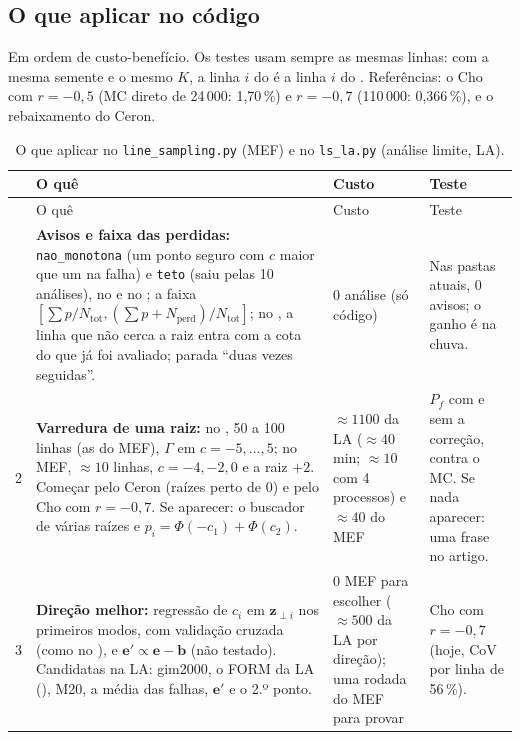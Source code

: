 \documentclass[11pt,a4paper]{article}
\begin{document}
\subsection{O que aplicar no código}\label{sec:codigo}
Em ordem de custo-benefício. Os testes usam sempre as mesmas linhas: com a mesma semente e o mesmo $K$, a linha $i$ do
 é a linha $i$ do . Referências: o Cho com $r = -0{,}5$ (MC direto de
24\,000: 1,70\,\%) e $r = -0{,}7$ (110\,000: 0,366\,\%), e o rebaixamento do Ceron.
{\small\setlength{\tabcolsep}{4pt}
\begin{longtable}{L{0.25cm}L{8.2cm}L{3.4cm}L{3.5cm}}
\caption{O que aplicar no \texttt{line\_sampling.py} (MEF) e no \texttt{ls\_la.py} (análise limite, LA).}
\label{tab:codigo}\\
\toprule
& O quê & Custo & Teste \\
\midrule\endfirsthead
\toprule & O quê & Custo & Teste \\ \midrule\endhead
\bottomrule{} & \textbf{Avisos e faixa das perdidas:} \texttt{nao\_monotona} (um ponto seguro com $c$ maior que um na falha) e
  \texttt{teto} (saiu pelas 10 análises), no  e no ; a faixa
  $[\sum p/N_\text{tot}, (\sum p + N_\text{perd})/N_\text{tot}]$; no , a linha que não cerca a raiz entra
  com a cota do que já foi avaliado; parada ``duas vezes seguidas''. &
  0 análise (só código) & Nas pastas atuais, 0 avisos; o ganho é na chuva. \\
2 & \textbf{Varredura de uma raiz:} no , 50 a 100 linhas (as do MEF), $\Gamma$ em $c = -5, \dots, 5$;
  no MEF, $\approx 10$ linhas, $c = -4, -2, 0$ e a raiz $+2$. Começar pelo Ceron (raízes perto de 0) e pelo Cho com
  $r = -0{,}7$. Se aparecer: o buscador de várias raízes e $p_i = \Phi(-c_1) + \Phi(c_2)$. &
  $\approx 1100$ da LA ($\approx 40$ min; $\approx 10$ com 4 processos) e $\approx 40$ do MEF &
  $P_f$ com e sem a correção, contra o MC. Se nada aparecer: uma frase no artigo. \\
3 & \textbf{Direção melhor:} regressão de $c_i$ em $\bm z_{\perp i}$ nos primeiros modos, com validação cruzada (como no
  ), e $\bm e' \propto \bm e - \bm b$ (não testado). Candidatas na LA: gim2000, o FORM da LA
  (), M20, a média das falhas, $\bm e'$ e o 2.º ponto. &
  0 MEF para escolher ($\approx 500$ da LA por direção); uma rodada do MEF para provar &
  Cho com $r = -0{,}7$ (hoje, CoV por linha de 56\,\%). \\

\end{longtable}}
\end{document}
